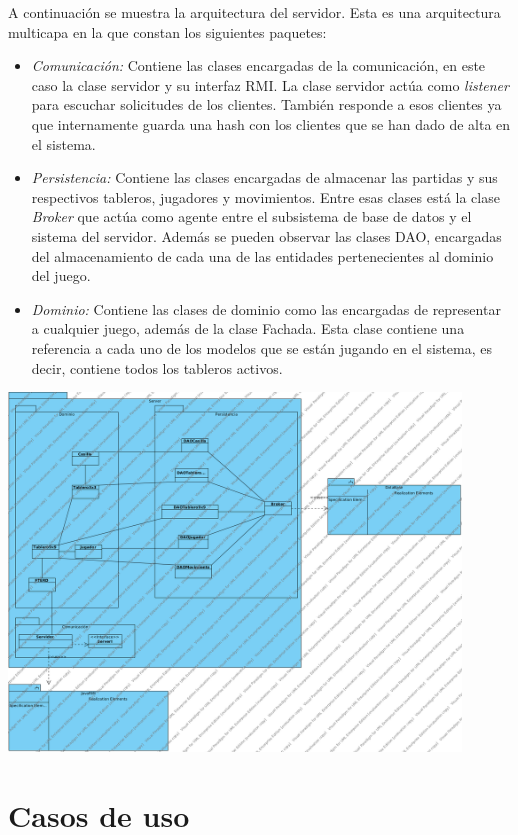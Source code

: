 \documentclass[a4paper,11pt,oneside]{article}
\begin{document}
A continuación se muestra la arquitectura del servidor. Esta es una arquitectura multicapa en la que constan los siguientes paquetes:
\begin{itemize}
\item \emph{Comunicación:} Contiene las clases encargadas de la comunicación, en este caso la clase servidor y su interfaz RMI. La clase servidor actúa como \emph{listener} para escuchar solicitudes de los clientes. También responde a esos clientes ya que internamente guarda una hash con los clientes que se han dado de alta en el sistema.
\item \emph{Persistencia:} Contiene las clases encargadas de almacenar las partidas y sus respectivos tableros, jugadores y movimientos. Entre esas clases está la clase \emph{Broker} que actúa como agente entre el subsistema de base de datos y el sistema del servidor. Además se pueden observar las clases DAO, encargadas del almacenamiento de cada una de las entidades pertenecientes al dominio del juego.
\item \emph{Dominio:} Contiene las clases de dominio como las encargadas de representar a cualquier juego, además de la clase Fachada. Esta clase contiene una referencia a cada uno de los modelos que se están jugando en el sistema, es decir, contiene todos los tableros activos.

\end{itemize}
\includegraphics[width=0.9\textwidth]{img/arq_Servidor.png}\\[1cm]

\clearpage
\section{Casos de uso}
\end{document}
